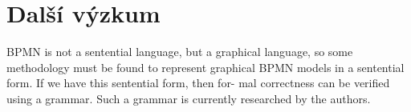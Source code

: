 \documentclass[]{article}
\begin{document}
\section{Další výzkum}
BPMN is not a sentential language, but a graphical language, so some methodology must be found to represent graphical BPMN models in a sentential form. If we have this sentential form, then for- mal correctness can be verified using a grammar. Such a grammar is currently researched by the authors.

\nocite{*}


\end{document}

